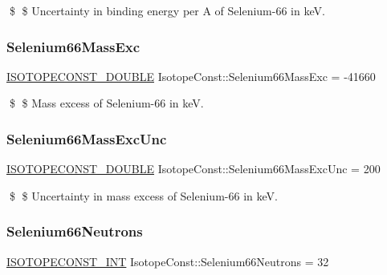 \$ \$ Uncertainty in binding energy per A of Selenium-\/66 in keV. \mbox{\label{group___isotope_const-_selenium-_se66_gabaad80968379533bab4efecef1a52154}} 
\subsubsection{\texorpdfstring{Selenium66\+Mass\+Exc}{Selenium66MassExc}}
{\footnotesize\ttfamily \mbox{\hyperlink{group___isotope_const-_macros_ga8f45a7272ce02c0b4c65c44636ed719a}{I\+S\+O\+T\+O\+P\+E\+C\+O\+N\+S\+T\+\_\+\+D\+O\+U\+B\+LE}} Isotope\+Const\+::\+Selenium66\+Mass\+Exc = -\/41660}

\$ \$ Mass excess of Selenium-\/66 in keV. \mbox{\label{group___isotope_const-_selenium-_se66_ga2939d5ff25e4252bf3fda1d2d1873973}} 
\subsubsection{\texorpdfstring{Selenium66\+Mass\+Exc\+Unc}{Selenium66MassExcUnc}}
{\footnotesize\ttfamily \mbox{\hyperlink{group___isotope_const-_macros_ga8f45a7272ce02c0b4c65c44636ed719a}{I\+S\+O\+T\+O\+P\+E\+C\+O\+N\+S\+T\+\_\+\+D\+O\+U\+B\+LE}} Isotope\+Const\+::\+Selenium66\+Mass\+Exc\+Unc = 200}

\$ \$ Uncertainty in mass excess of Selenium-\/66 in keV. \mbox{\label{group___isotope_const-_selenium-_se66_ga77eb73ffd5965dbe43cab1c32d5c17db}} 
\subsubsection{\texorpdfstring{Selenium66\+Neutrons}{Selenium66Neutrons}}
{\footnotesize\ttfamily \mbox{\hyperlink{group___isotope_const-_macros_ga5f18360b3e99483a35c32d789e62621c}{I\+S\+O\+T\+O\+P\+E\+C\+O\+N\+S\+T\+\_\+\+I\+NT}} Isotope\+Const\+::\+Selenium66\+Neutrons = 32}

